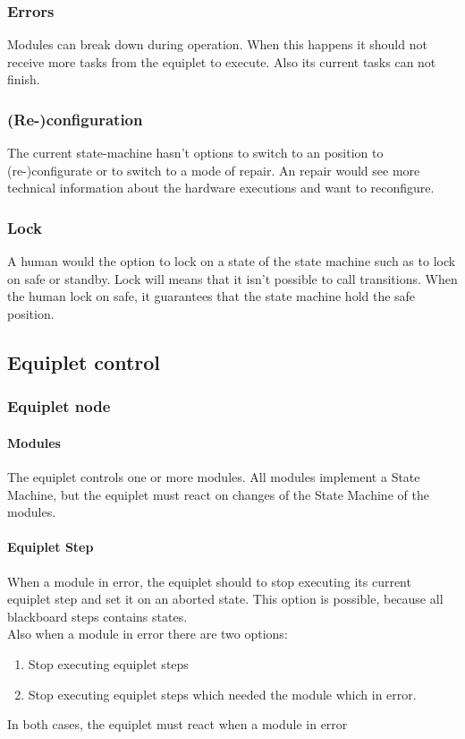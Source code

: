 \documentclass[12pt,a4paper]{report}
\begin{document}
\subsubsection{Errors}
Modules can break down during operation. When this happens it should not receive more tasks from the equiplet to execute. Also its current tasks can not finish.
\subsubsection{(Re-)configuration}
The current state-machine hasn't options to switch to an position to (re-)configurate or to switch to a mode of repair. An repair would see more technical information about the hardware executions and want to reconfigure.
\subsubsection{Lock}
A human would the option to lock on a state of the state machine such as to lock on safe or standby. Lock will means that it isn't possible to call transitions. When the human lock on safe, it guarantees that the state machine hold the safe position.
\subsection{Equiplet control}
\subsubsection{Equiplet node}
\paragraph{Modules}The equiplet controls one or more modules. All modules implement a State Machine, but the equiplet must react on changes of the State Machine of the modules.
\paragraph{Equiplet Step}When a module in error, the equiplet should to stop executing its current equiplet step and set it on an aborted state. This option is possible, because all blackboard steps contains states. 
\\Also when a module in error there are two options:
\begin{enumerate}
\item Stop executing equiplet steps
\item Stop executing equiplet steps which needed the module which in error.
\end{enumerate}
In both cases, the equiplet must react when a module in error
\end{document}

